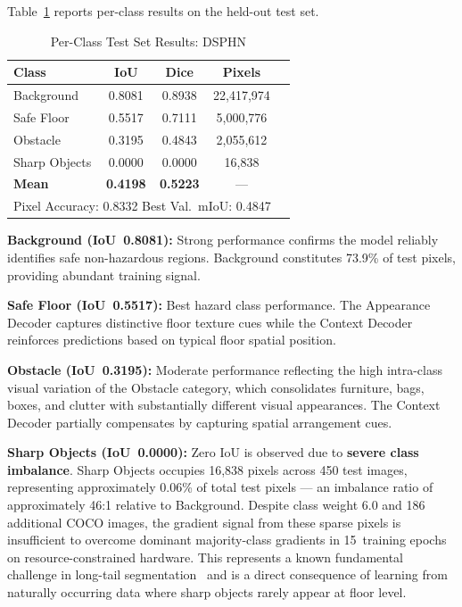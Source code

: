 Table~\ref{tab:perclass} reports per-class results on the held-out
test set.

\begin{table}[h]
\centering
\caption{Per-Class Test Set Results: DSPHN}
\label{tab:perclass}
\begin{tabular}{lcccc}
\toprule
\textbf{Class} & \textbf{IoU} & \textbf{Dice} & \textbf{Pixels} \\
\midrule
Background      & 0.8081 & 0.8938 & 22,417,974 \\
Safe Floor      & 0.5517 & 0.7111 & 5,000,776  \\
Obstacle        & 0.3195 & 0.4843 & 2,055,612  \\
Sharp Objects   & 0.0000 & 0.0000 & 16,838     \\
\midrule
\textbf{Mean}   & \textbf{0.4198} & \textbf{0.5223} & --- \\
\midrule
\multicolumn{4}{l}{Pixel Accuracy: 0.8332 \quad Best Val.\ mIoU: 0.4847} \\
\bottomrule
\end{tabular}
\end{table}

\noindent\textbf{Background (IoU~0.8081):}
Strong performance confirms the model reliably identifies safe
non-hazardous regions. Background constitutes 73.9\% of test
pixels, providing abundant training signal.

\noindent\textbf{Safe Floor (IoU~0.5517):}
Best hazard class performance. The Appearance Decoder captures
distinctive floor texture cues while the Context Decoder reinforces
predictions based on typical floor spatial position.

\noindent\textbf{Obstacle (IoU~0.3195):}
Moderate performance reflecting the high intra-class visual
variation of the Obstacle category, which consolidates furniture,
bags, boxes, and clutter with substantially different visual
appearances. The Context Decoder partially compensates by
capturing spatial arrangement cues.

\noindent\textbf{Sharp Objects (IoU~0.0000):}
Zero IoU is observed due to \textbf{severe class imbalance}.
Sharp Objects occupies 16,838 pixels across 450 test images,
representing approximately 0.06\% of total test pixels — an
imbalance ratio of approximately 46:1 relative to Background.
Despite class weight 6.0 and 186 additional COCO images, the
gradient signal from these sparse pixels is insufficient to
overcome dominant majority-class gradients in 15~training epochs
on resource-constrained hardware. This represents a known
fundamental challenge in long-tail segmentation~\cite{lin2017focal}
and is a direct consequence of learning from naturally occurring
data where sharp objects rarely appear at floor level.

